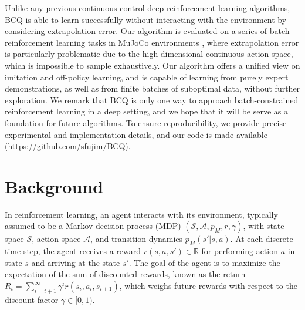 \documentclass{article}
\newcommand{\y}{\gamma}
\begin{document}
Unlike any previous continuous control deep reinforcement learning algorithms, BCQ is able to learn successfully without interacting with the environment by considering extrapolation error. Our algorithm is evaluated on a series of batch reinforcement learning tasks in MuJoCo environments \cite{mujoco,OpenAIGym}, where extrapolation error is particularly problematic due to the high-dimensional continuous action space, which is impossible to sample exhaustively.
Our algorithm offers a unified view on imitation and off-policy learning, and is capable of learning from purely expert demonstrations, as well as from finite batches of suboptimal data, without further exploration. We remark that BCQ is only one way to approach batch-constrained reinforcement learning in a deep setting, and we hope that it will be serve as a foundation for future algorithms. 
To ensure reproducibility, we provide precise experimental and implementation details, and our code is made available (\url{https://github.com/sfujim/BCQ}).

\vspace{-2mm}
\section{Background}

In reinforcement learning, an agent interacts with its environment, typically assumed to be a Markov decision process (MDP) $(\mathcal{S}, \mathcal{A}, p_M, r, \y)$, with state space $\mathcal{S}$, action space $\mathcal{A}$, and transition dynamics $p_M(s'|s,a)$. 
At each discrete time step, the agent receives a reward $r(s,a,s') \in \mathbb{R}$ for performing action $a$ in state $s$ and arriving at the state $s'$. The goal of the agent is to maximize the expectation of the sum of discounted rewards, known as the return $R_t = \sum_{i={t+1}}^\infty \y^i r(s_i, a_i, s_{i+1})$, which weighs future rewards with respect to the discount factor $\y \in [0,1)$. 
\end{document}
